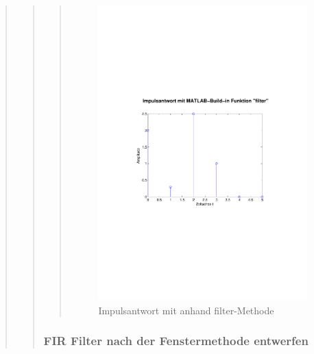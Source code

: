 \begin{quote}
\begin{quote}
\begin{quote}
			\begin{figure}[H]
		            \centering
		                \includegraphics[scale=0.5, trim = 1cm 6cm 1.5cm 8cm,
		                clip]{./Bilder/Impulsantwort_aufgabe11}
		                    \caption{Impulsantwort mit anhand filter-Methode}
		                    \label{fig:./Bilder/Impulsantwort_aufgabe11}
		            \end{figure}
		       
		  \end{quote}   
		  
		  \subsubsection{FIR Filter nach der Fenstermethode entwerfen}
		  \begin{quote}
		            

\end{quote}
\end{quote}
\end{quote}
